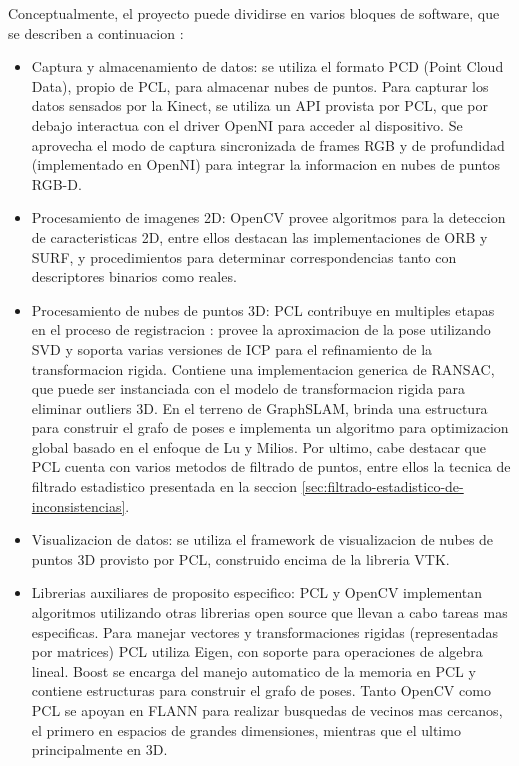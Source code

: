 Conceptualmente, el proyecto puede dividirse en varios bloques de software, que se describen a continuacion :
\begin{itemize}

\item Captura y almacenamiento de datos: se utiliza el formato PCD (Point Cloud Data), propio de PCL, para almacenar nubes de puntos. Para capturar los datos sensados por la Kinect, se utiliza un API provista por PCL, que por debajo interactua con el driver OpenNI para acceder al dispositivo. Se aprovecha el modo de captura sincronizada de frames RGB y de profundidad (implementado en OpenNI) para integrar la informacion en nubes de puntos RGB-D.

\item Procesamiento de imagenes 2D: OpenCV provee algoritmos para la deteccion de caracteristicas 2D, entre ellos destacan las implementaciones de ORB y SURF, y procedimientos para determinar correspondencias tanto con descriptores binarios como reales.

\item Procesamiento de nubes de puntos 3D: PCL contribuye en multiples etapas en el proceso de registracion : provee la aproximacion de la pose utilizando SVD y soporta varias versiones de ICP para el refinamiento de la transformacion rigida. Contiene una implementacion generica de RANSAC, que puede ser instanciada con el modelo de transformacion rigida para eliminar outliers 3D. En el terreno de GraphSLAM, brinda una estructura para construir el grafo de poses e implementa un algoritmo para optimizacion global basado en el enfoque de Lu y Milios. Por ultimo, cabe destacar que PCL cuenta con varios metodos de filtrado de puntos, entre ellos la tecnica de filtrado estadistico presentada en la seccion \ref{sec:filtrado-estadistico-de-inconsistencias}.

\item Visualizacion de datos: se utiliza el framework de visualizacion de nubes de puntos 3D provisto por PCL, construido encima de la libreria VTK.

\item Librerias auxiliares de proposito especifico: PCL y OpenCV implementan algoritmos utilizando otras librerias open source que llevan a cabo tareas mas especificas. Para manejar vectores y transformaciones rigidas (representadas por matrices) PCL utiliza Eigen, con soporte para operaciones de algebra lineal. Boost se encarga del manejo automatico de la memoria en PCL y contiene estructuras para construir el grafo de poses. Tanto OpenCV como PCL se apoyan en FLANN para realizar busquedas de vecinos mas cercanos, el primero en espacios de grandes dimensiones, mientras que el ultimo principalmente en 3D.

\end{itemize}

